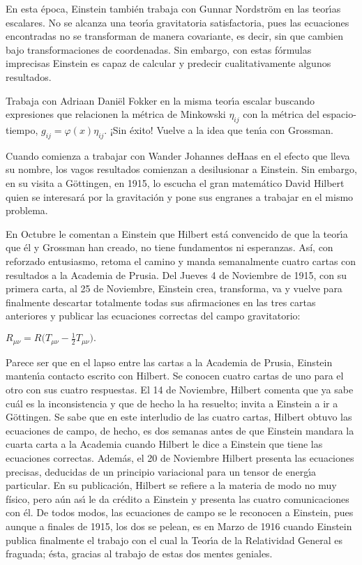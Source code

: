 \documentclass[12pt]{article}
\begin{document}
En esta época, Einstein también trabaja con Gunnar Nordstr\"om en las teor\'{\i}as escalares. No se alcanza una teor\'{\i}a gravitatoria satisfactoria, pues las ecuaciones encontradas no se transforman de manera covariante, es decir, sin que cambien bajo transformaciones de coordenadas. Sin embargo, con estas f\'ormulas imprecisas Einstein es capaz de calcular y predecir cualitativamente algunos resultados.

Trabaja con Adriaan Daniël Fokker en la misma teor\'{\i}a escalar buscando expresiones que relacionen la m\'etrica de Minkowski $\eta_{ij}$ con la m\'etrica del espacio-tiempo, $g_{ij}=\varphi(x)\eta_{ij}$. ¡Sin éxito! Vuelve a la idea que ten\'{\i}a con Grossman.

Cuando comienza a trabajar con Wander Johannes deHaas en el efecto que lleva su nombre, los vagos resultados comienzan a desilusionar a Einstein. Sin embargo, en su visita a G\"ottingen, en 1915, lo escucha el gran matem\'atico David Hilbert quien se interesará por la gravitaci\'on y pone sus engranes a trabajar en el mismo problema.

En Octubre le comentan a Einstein que Hilbert est\'a convencido de que la teor\'{\i}a que \'el y Grossman han creado, no tiene fundamentos ni esperanzas. Así, con reforzado entusiasmo, retoma el camino y manda semanalmente cuatro cartas con resultados a la Academia de Prusia. Del Jueves 4 de Noviembre de 1915, con su primera carta, al 25 de Noviembre, Einstein crea, transforma, va y vuelve para finalmente descartar totalmente todas sus afirmaciones en las tres cartas anteriores y publicar las ecuaciones correctas del campo gravitatorio:
\begin{mdframed}[userdefinedwidth=5cm,align=center]
\centering
$R_{\mu\nu}=R\Big(T_{\mu\nu}-\frac{1}{2} T_{\mu\nu}\Big).$
\end{mdframed}

Parece ser que en el lapso entre las cartas a la Academia de Prusia, Einstein manten\'{\i}a contacto escrito con Hilbert. Se conocen cuatro cartas de uno para el otro con sus cuatro respuestas. El 14 de Noviembre, Hilbert comenta que ya sabe cu\'al es la inconsistencia y que de hecho la ha resuelto; invita a Einstein a ir a G\"ottingen. Se sabe que en este interludio de las cuatro cartas, Hilbert obtuvo las ecuaciones de campo, de hecho, es dos semanas antes de que Einstein mandara la cuarta carta a la Academia cuando Hilbert le dice a Einstein que tiene las ecuaciones correctas. Adem\'as, el 20 de Noviembre Hilbert presenta las ecuaciones precisas, deducidas de un principio variacional para un tensor de energ\'{\i}a particular. En su publicación, Hilbert se refiere a la materia de modo no muy físico, pero a\'un as\'{\i} le da cr\'edito a Einstein y presenta las cuatro comunicaciones con \'el. De todos modos, las ecuaciones de campo se le reconocen a Einstein, pues aunque a finales de 1915, los dos se pelean, es en Marzo de 1916 cuando Einstein publica finalmente el trabajo con el cual la Teor\'{\i}a de la Relatividad General es fraguada; ésta, gracias al trabajo de estas dos mentes geniales.
\end{document}
